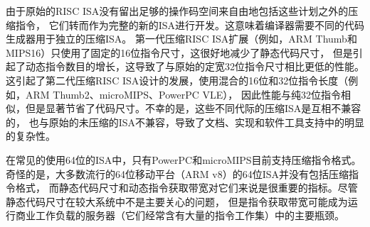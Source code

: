 \begin{commentary}
由于原始的RISC ISA没有留出足够的操作码空间来自由地包括这些计划之外的压缩指令，
它们转而作为完整的新的ISA进行开发。这意味着编译器需要不同的代码生成器用于独立的压缩ISA。
第一代压缩RISC ISA扩展（例如，ARM Thumb和MIPS16）只使用了固定的16位指令尺寸，这很好地减少了静态代码尺寸，
但是引起了动态指令数目的增长，这导致了与原始的定宽32位指令尺寸相比更低的性能。
这引起了第二代压缩RISC ISA设计的发展，使用混合的16位和32位指令长度（例如，ARM Thumb2、microMIPS、PowerPC VLE），
因此性能与纯32位指令相似，但是显著节省了代码尺寸。不幸的是，这些不同代际的压缩ISA是互相不兼容的，
也与原始的未压缩的ISA不兼容，导致了文档、实现和软件工具支持中的明显的复杂性。

在常见的使用64位的ISA中，只有PowerPC和microMIPS目前支持压缩指令格式。
奇怪的是，大多数流行的64位移动平台（ARM v8）的64位ISA并没有包括压缩指令格式，
而静态代码尺寸和动态指令获取带宽对它们来说是很重要的指标。尽管静态代码尺寸在较大系统中不是主要关心的问题，
但是指令获取带宽可能成为运行商业工作负载的服务器（它们经常含有大量的指令工作集）中的主要瓶颈。


\end{commentary}
